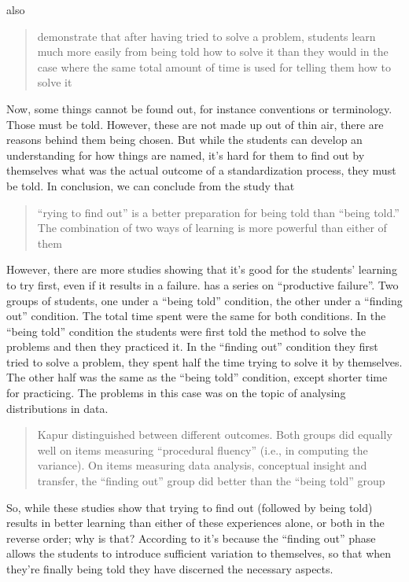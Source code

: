 \Textcite{BransfordSchwartz1999} also
\blockquote[{\cite[p.~217]{NecessaryConditionsOfLearning}}]{%
  demonstrate that after having tried to solve a problem, students 
  learn much more easily from being told how to solve it than they would in the 
  case where the same total amount of time is used for telling them how to 
  solve it%
}.
Now, some things cannot be found out, for instance conventions or terminology.
Those must be told.
However, these are not made up out of thin air, there are reasons behind them 
being chosen.
But while the students can develop an understanding for how things are named, 
it's hard for them to find out by themselves what was the actual outcome of a 
standardization process, they must be told.
In conclusion, we can conclude from the \textcite{BransfordSchwartz1999} study 
that \blockquote[{\cite[p.~218]{NecessaryConditionsOfLearning}}]{%
  \enquote{rying to find out} is a better preparation for being told 
  than \enquote{being told.} The combination of two ways of learning is more 
  powerful than either of them%
}.

However, there are more studies showing that it's good for the students' 
learning to try first, even if it results in a failure.
\Textcite{kapur2008productive,kapur2010productive,kapur2012productive} has a 
series on \enquote{productive failure}.
Two groups of students, one under a \enquote{being told} condition, the other 
under a \enquote{finding out} condition.
The total time spent were the same for both conditions.
In the \enquote{being told} condition the students were first told the method 
to solve the problems and then they practiced it.
In the \enquote{finding out} condition they first tried to solve a problem, 
they spent half the time trying to solve it by themselves.
The other half was the same as the \enquote{being told} condition, except 
shorter time for practicing.
The problems in this case was on the topic of analysing distributions in data.
\blockquote[{\cite[p.~219]{NecessaryConditionsOfLearning}}]{%
  Kapur distinguished between different outcomes. Both groups
  did equally well on items measuring \enquote{procedural fluency} (i.e., in 
  computing the variance). On items measuring data analysis, conceptual insight 
  and transfer, the \enquote{finding out} group did better than the 
  \enquote{being told} group
}.

So, while these studies show that trying to find out (followed by being told) 
results in better learning than either of these experiences alone, or both in 
the reverse order; why is that?
According to \textcite{NecessaryConditionsOfLearning} it's because the 
\enquote{finding out} phase allows the students to introduce sufficient 
variation to themselves, so that when they're finally being told they have 
discerned the necessary aspects.

